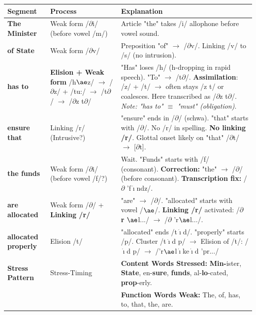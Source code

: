 \documentclass[11pt]{article}
\newcommand{\cle}[1]{{\popxbold\color{popdark}#1}}
\begin{document}
\begin{exoresolu}
\begin{center}
\begin{tabularx}{\linewidth}{|l|l|X|}
\hline
\rowcolor{popblueL} \textbf{Segment} & \textbf{Process} & \textbf{Explanation} \\
\hline
\textbf{The Minister} & Weak form /$\partial$i/ (before vowel /m/) & Article "the" takes /i/ allophone before vowel sound. \\
\hline
\textbf{of State} & Weak form /$\partial$v/ & Preposition "of" $\rightarrow$ /$\partial$v/. Linking /v/ to /s/ (no intrusion). \\
\hline
\textbf{has to} & \textbf{Elision + Weak form} /h$\ae$z/ $\rightarrow$ /$\partial$z/ + /tu:/ $\rightarrow$ /t$\partial$/ $\rightarrow$ /$\partial$z t$\partial$/ & "Has" loses /h/ (h-dropping in rapid speech). "To" $\rightarrow$ /t$\partial$/. \textbf{Assimilation}: /z/ + /t/ $\rightarrow$ often stays /z t/ or coalesces. Here transcribed as /$\partial$z t$\partial$/. \emph{Note: "has to" $\equiv$ "must" (obligation)}. \\
\hline
\textbf{ensure that} & Linking /r/ (Intrusive?) & "ensure" ends in /$\partial$/ (schwa). "that" starts with /$\partial$/. No /r/ in spelling. \textbf{No linking /r/}. Glottal onset likely on "that" /$\partial$t/ $\rightarrow$ [$\partial$t]. \\
\hline
\textbf{the funds} & Weak form /$\partial$i/ (before vowel /f/?) & Wait. "Funds" starts with /f/ (consonant). \textbf{Correction:} "the" $\rightarrow$ /$\partial$/ (before consonant). \textbf{Transcription fix:} /$\partial$ 'f$\mathrm{\dot{\imath}}$ndz/. \\
\hline
\textbf{are allocated} & Weak form /$\partial$/ + \textbf{Linking /r/} & "are" $\rightarrow$ /$\partial$/. "allocated" starts with vowel /$\ae$/. \textbf{Linking /r/} activated: /$\partial$ \textbf{r} $\ae$l.../ $\rightarrow$ /$\partial$ 'r$\ae$l.../. \\
\hline
\textbf{allocated properly} & Elision /t/ & "allocated" ends /t$\mathrm{\dot{\imath}}$d/. "properly" starts /p/. Cluster /t$\mathrm{\dot{\imath}}$d p/ $\rightarrow$ Elision of /t/: /$\mathrm{\dot{\imath}}$d p/ $\rightarrow$ /'r$\ae$l$\mathrm{\dot{\imath}}$ke$\mathrm{\dot{\imath}}$d 'pr.../ \\
\hline
\textbf{Stress Pattern} & \cle{Stress-Timing} & \textbf{Content Words Stressed:} \textbf{Min-}ister, \textbf{State}, en-\textbf{sure}, \textbf{funds}, al-\textbf{lo}-cated, \textbf{prop}-erly. \\
& & \textbf{Function Words Weak:} The, of, has, to, that, the, are. \\
\hline
\end{tabularx}
\end{center}


\end{exoresolu}
\end{document}
